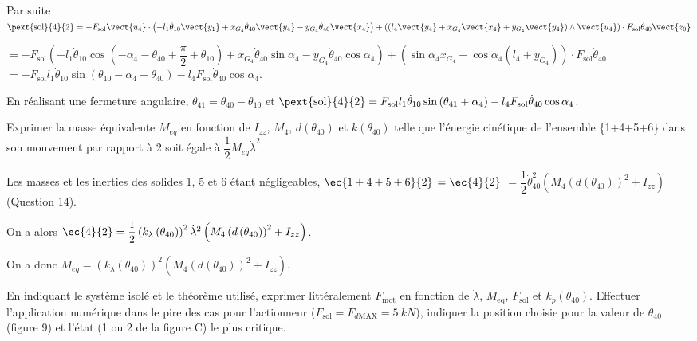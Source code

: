 \documentclass[11pt]{article}
\begin{document}
\begin{UPSTIcorrige}
Par suite $
\pext{\text{sol}}{4}{2} =-F_{\text{sol}}\vect{u_4} \cdot \left( -l_1\dot{\theta}_{10} \vect{y_1} +  x_{G_4} \dot{\theta}_{40} \vect{y_4}- y_{G_4} \dot{\theta}_{40} \vect{x_4}\right) + \left(\left( l_4 \vect{y_4} +  x_{G_4} \vect{x_4}+ y_{G_4} \vect{y_4}\right)\wedge \vect{u_4}  \right)\cdot F_{\text{sol}} \dot{\theta}_{40}\vect{z_0}$

$=-F_{\text{sol}} \left( -l_1\dot{\theta}_{10}\cos\left( -\alpha_4 - \theta_{40} +\dfrac{\pi}{2} + \theta_{10}\right) +  x_{G_4} \dot{\theta}_{40}\sin \alpha_4- y_{G_4} \dot{\theta}_{40}\cos\alpha_4\right)  + \left( \sin \alpha_4 x_{G_4} - \cos \alpha_4 \left( l_4 + y_{G_4}\right) \right)\cdot F_{\text{sol}} \dot{\theta}_{40}$
$=-F_{\text{sol}} l_1\dot{\theta}_{10}\sin\left(  \theta_{10}-\alpha_4 - \theta_{40}\right)     - l_4  F_{\text{sol}} \dot{\theta}_{40} \cos \alpha_4 $. 

En réalisant une fermeture angulaire, $\theta_{41} = \theta_{40} -\theta_{10}$ et
$\pext{\text{sol}}{4}{2}=F_{\text{sol}} l_1\dot{\theta}_{10}\sin\left(  \theta_{41}+\alpha_4 \right)     - l_4  F_{\text{sol}} \dot{\theta}_{40} \cos \alpha_4 $. 



\end{UPSTIcorrige}


\UPSTIquestion Exprimer la masse équivalente $M_{eq}$ en fonction de $I_{zz}$, $M_4$, $d\left(\theta_{40}\right)$ et $k\left(\theta_{40}\right)$ telle que l’énergie cinétique de l’ensemble \{1+4+5+6\} dans son mouvement par rapport à 2 soit égale à $\dfrac{1}{2}M_{eq} \dot{\lambda}^2$.

\begin{UPSTIcorrige}
Les masses et les inerties des solides 1, 5 et 6 étant négligeables, $  \ec{1+4+5+6}{2}$ $=\ec{4}{2}$ $= \dfrac{1}{2}  \dot{\theta}_{40}^2 \left(M_4   \left(d\left( \theta_{40}\right) \right)^2 +  I_{zz} \right)$ (Question 14). 

On a alors  $\ec{4}{2}= \dfrac{1}{2} \left( k_{\lambda} \left(\theta_{40}\right)\right) ^2\dot{\lambda}^2 \left(M_4   \left(d\left( \theta_{40}\right) \right)^2 +  I_{zz} \right)$.

On a donc $M_{eq}=  \left( k_{\lambda} \left(\theta_{40}\right)\right) ^2 \left(M_4   \left(d\left( \theta_{40}\right) \right)^2 +  I_{zz} \right)$.
\end{UPSTIcorrige}



\UPSTIquestion  En indiquant le système isolé et le théorème utilisé, exprimer littéralement $F_{\text{mot}}$ en fonction de $\ddot{\lambda}$, $M_{\text{eq}}$, $F_{\text{sol}}$ et $k_p\left(\theta_{40}\right)$. Effectuer l’application numérique dans le pire des cas pour l’actionneur ($F_{\text{sol}} = F_{d \text{MAX}}=\SI{5}{kN}$),
indiquer la position choisie pour la valeur de $\theta_{40}$ (figure 9) et l’état (1 ou 2 de la figure C) le plus critique.
\end{document}
